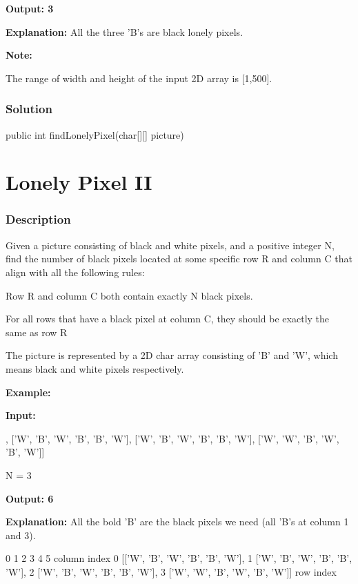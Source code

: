 \textbf{Output: 3}

\textbf{Explanation:} All the three 'B's are black lonely pixels.

\textbf{Note:}

The range of width and height of the input 2D array is [1,500].

\subsubsection{Solution}

\begin{Code}
public int findLonelyPixel(char[][] picture) {

}
\end{Code}

\newpage

\section{Lonely Pixel II} %

\subsubsection{Description}

Given a picture consisting of black and white pixels, and a positive integer N, find the number of black pixels located at some specific row R and column C that align with all the following rules:

Row R and column C both contain exactly N black pixels.

For all rows that have a black pixel at column C, they should be exactly the same as row R

The picture is represented by a 2D char array consisting of 'B' and 'W', which means black and white pixels respectively.

\textbf{Example:}

\textbf{Input:}
\begin{Code}
[['W', 'B', 'W', 'B', 'B', 'W'],
 ['W', 'B', 'W', 'B', 'B', 'W'],
 ['W', 'B', 'W', 'B', 'B', 'W'],
 ['W', 'W', 'B', 'W', 'B', 'W']]
\end{Code}

N = 3

\textbf{Output: 6}

\textbf{Explanation:} All the bold 'B' are the black pixels we need (all 'B's at column 1 and 3).
\begin{Code}
        0    1    2    3    4    5         column index
0    [['W', 'B', 'W', 'B', 'B', 'W'],
1     ['W', 'B', 'W', 'B', 'B', 'W'],
2     ['W', 'B', 'W', 'B', 'B', 'W'],
3     ['W', 'W', 'B', 'W', 'B', 'W']]
row index
\end{Code}

